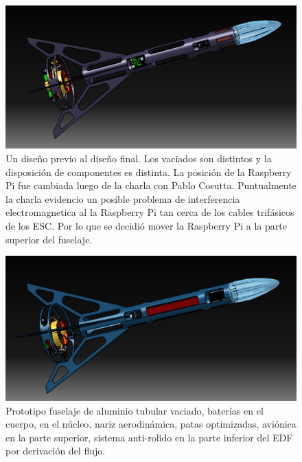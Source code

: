 \begin{figure}[htb]
    \centering
    \includegraphics[width=\linewidth]{fig/design/4}
    \caption{Un diseño previo al diseño final. Los vaciados son distintos y la disposición de componentes es distinta. La posición de la Raspberry Pi fue cambiada luego de la charla con Pablo Cosutta. Puntualmente la charla evidencio un posible problema de interferencia electromagnetica al la Raspberry Pi tan cerca de los cables trifásicos de los ESC. Por lo que se decidió mover la Raspberry Pi a la parte superior del fuselaje.}
    \label{fig:design/4}
\end{figure}

\begin{figure}[htb]
    \centering
    \includegraphics[width=\linewidth]{fig/design/5}
    \caption{Prototipo fuselaje de aluminio tubular vaciado, baterías en el cuerpo, en el núcleo, nariz aerodinámica, patas optimizadas, aviónica en la parte superior, sistema anti-rolido en la parte
    inferior del EDF por derivación del flujo.}
    \label{fig:design/5}
\end{figure}

\null\newpage
\clearpage
